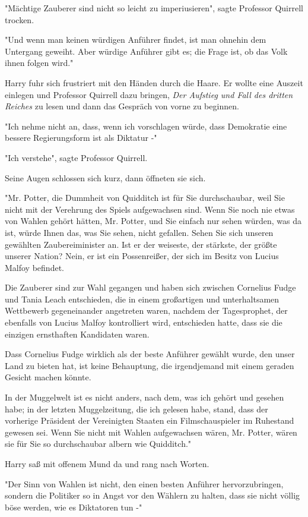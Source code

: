 {"Mächtige Zauberer sind nicht so leicht zu imperiusieren", sagte Professor Quirrell trocken.

"Und wenn man keinen würdigen Anführer findet, ist man ohnehin dem Untergang geweiht. Aber würdige Anführer gibt es; die Frage ist, ob das Volk ihnen folgen wird."

Harry fuhr sich frustriert mit den Händen durch die Haare. Er wollte eine Auszeit einlegen und Professor Quirrell dazu bringen, \emph{Der Aufstieg und Fall des dritten Reiches} zu lesen und dann das Gespräch von vorne zu beginnen.

"Ich nehme nicht an, dass, wenn ich vorschlagen würde, dass Demokratie eine bessere Regierungsform ist als Diktatur -"

"Ich verstehe", sagte Professor Quirrell.

Seine Augen schlossen sich kurz, dann öffneten sie sich.

"Mr. Potter, die Dummheit von Quidditch ist für Sie durchschaubar, weil Sie nicht mit der Verehrung des Spiels aufgewachsen sind. Wenn Sie noch nie etwas von Wahlen gehört hätten, Mr. Potter, und Sie einfach nur sehen würden, was da ist, würde Ihnen das, was Sie sehen, nicht gefallen. Sehen Sie sich unseren gewählten Zaubereiminister an. Ist er der weiseste, der stärkste, der größte unserer Nation? Nein, er ist ein Possenreißer, der sich im Besitz von Lucius Malfoy befindet.

Die Zauberer sind zur Wahl gegangen und haben sich zwischen Cornelius Fudge und Tania Leach entschieden, die in einem großartigen und unterhaltsamen Wettbewerb gegeneinander angetreten waren, nachdem der Tagesprophet, der ebenfalls von Lucius Malfoy kontrolliert wird, entschieden hatte, dass sie die einzigen ernsthaften Kandidaten waren.

Dass Cornelius Fudge wirklich als der beste Anführer gewählt wurde, den unser Land zu bieten hat, ist keine Behauptung, die irgendjemand mit einem geraden Gesicht machen könnte.

In der Muggelwelt ist es nicht anders, nach dem, was ich gehört und gesehen habe; in der letzten Muggelzeitung, die ich gelesen habe, stand, dass der vorherige Präsident der Vereinigten Staaten ein Filmschauspieler im Ruhestand gewesen sei. Wenn Sie nicht mit Wahlen aufgewachsen wären, Mr. Potter, wären sie für Sie so durchschaubar albern wie Quidditch."

Harry saß mit offenem Mund da und rang nach Worten.

"Der Sinn von Wahlen ist nicht, den einen besten Anführer hervorzubringen, sondern die Politiker so in Angst vor den Wählern zu halten, dass sie nicht völlig böse werden, wie es Diktatoren tun -"

}
